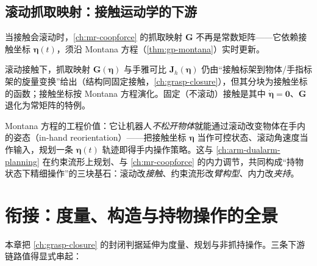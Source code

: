 \subsection{滚动抓取映射：接触运动学的下游}
当接触会滚动时，\cref{ch:mr-coopforce} 的抓取映射 $\mathbf{G}$ 不再是常数矩阵——它依赖接触坐标 $\boldsymbol{\eta}(t)$，须沿 Montana 方程（\cref{thm:gp-montana}）实时更新。

\begin{proposition}\label{prop:gp-rolling-grasp}
滚动接触下，抓取映射 $\mathbf{G}(\boldsymbol{\eta})$ 与手雅可比 $\mathbf{J}_h(\boldsymbol{\eta})$ 仍由“接触标架到物体/手指标架的旋量变换”给出（结构同固定接触，\cref{ch:grasp-closure}），但其分块为接触坐标的函数；接触坐标按 Montana 方程演化。固定（不滚动）接触是其中 $\dot{\boldsymbol{\eta}}=\mathbf{0}$、$\mathbf{G}$ 退化为常矩阵的特例。
\end{proposition}

\begin{insight}
Montana 方程的工程价值：它让机器人\emph{不松开物体}就能通过滚动改变物体在手内的姿态（in-hand reorientation）——把接触坐标 $\boldsymbol{\eta}$ 当作可控状态、滚动角速度当作输入，规划一条 $\boldsymbol{\eta}(t)$ 轨迹即得手内操作策略。这与 \cref{ch:arm-dualarm-planning} 在约束流形上规划、与 \cref{ch:mr-coopforce} 的内力调节，共同构成“持物状态下精细操作”的三块基石：滚动改\emph{接触}、约束流形改\emph{臂构型}、内力改\emph{夹持}。
\end{insight}

\section{衔接：度量、构造与持物操作的全景}
\label{sec:gp-bridge}

本章把 \cref{ch:grasp-closure} 的封闭判据延伸为度量、规划与非抓持操作。三条下游链路值得显式串起：


